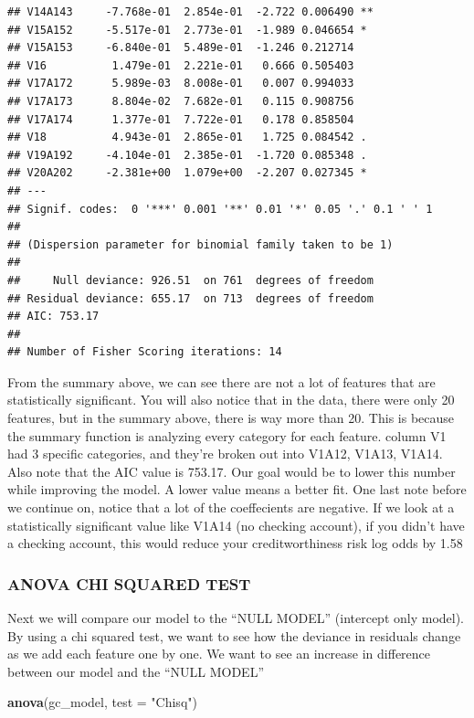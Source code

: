 \documentclass[]{article}
\newenvironment{Shaded}{\begin{snugshade}}{\end{snugshade}}
\newcommand{\KeywordTok}[1]{\textcolor[rgb]{0.13,0.29,0.53}{\textbf{#1}}}
\newcommand{\DataTypeTok}[1]{\textcolor[rgb]{0.13,0.29,0.53}{#1}}
\newcommand{\StringTok}[1]{\textcolor[rgb]{0.31,0.60,0.02}{#1}}
\newcommand{\NormalTok}[1]{#1}
\begin{document}
\begin{verbatim}
## V14A143     -7.768e-01  2.854e-01  -2.722 0.006490 ** 
## V15A152     -5.517e-01  2.773e-01  -1.989 0.046654 *  
## V15A153     -6.840e-01  5.489e-01  -1.246 0.212714    
## V16          1.479e-01  2.221e-01   0.666 0.505403    
## V17A172      5.989e-03  8.008e-01   0.007 0.994033    
## V17A173      8.804e-02  7.682e-01   0.115 0.908756    
## V17A174      1.377e-01  7.722e-01   0.178 0.858504    
## V18          4.943e-01  2.865e-01   1.725 0.084542 .  
## V19A192     -4.104e-01  2.385e-01  -1.720 0.085348 .  
## V20A202     -2.381e+00  1.079e+00  -2.207 0.027345 *  
## ---
## Signif. codes:  0 '***' 0.001 '**' 0.01 '*' 0.05 '.' 0.1 ' ' 1
## 
## (Dispersion parameter for binomial family taken to be 1)
## 
##     Null deviance: 926.51  on 761  degrees of freedom
## Residual deviance: 655.17  on 713  degrees of freedom
## AIC: 753.17
## 
## Number of Fisher Scoring iterations: 14
\end{verbatim}

From the summary above, we can see there are not a lot of features that
are statistically significant. You will also notice that in the data,
there were only 20 features, but in the summary above, there is way more
than 20. This is because the summary function is analyzing every
category for each feature. column V1 had 3 specific categories, and
they're broken out into V1A12, V1A13, V1A14. Also note that the AIC
value is 753.17. Our goal would be to lower this number while improving
the model. A lower value means a better fit. One last note before we
continue on, notice that a lot of the coeffecients are negative. If we
look at a statistically significant value like V1A14 (no checking
account), if you didn't have a checking account, this would reduce your
creditworthiness risk log odds by 1.58

\subsubsection{ANOVA CHI SQUARED TEST}\label{anova-chi-squared-test}

Next we will compare our model to the ``NULL MODEL'' (intercept only
model). By using a chi squared test, we want to see how the deviance in
residuals change as we add each feature one by one. We want to see an
increase in difference between our model and the ``NULL MODEL''

\begin{Shaded}
\begin{Highlighting}[]
\KeywordTok{anova}\NormalTok{(gc_model, }\DataTypeTok{test =} \StringTok{"Chisq"}\NormalTok{)}
\end{Highlighting}
\end{Shaded}
\end{document}
